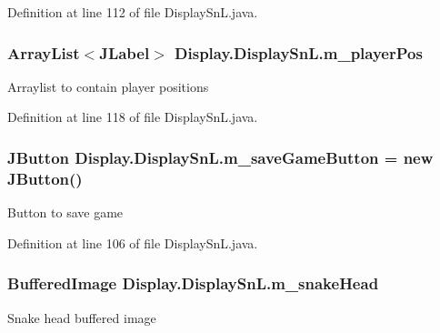 Definition at line 112 of file Display\+Sn\+L.\+java.

\hypertarget{class_display_1_1_display_sn_l_aa4b30638e1d8f99b5052652ea02d6365}{}
\subsubsection[{m\+\_\+player\+Pos}]{\setlength{\rightskip}{0pt plus 5cm}Array\+List$<$J\+Label$>$ Display.\+Display\+Sn\+L.\+m\+\_\+player\+Pos\hspace{0.3cm}{\ttfamily [private]}}\label{class_display_1_1_display_sn_l_aa4b30638e1d8f99b5052652ea02d6365}
Arraylist to contain player positions 

Definition at line 118 of file Display\+Sn\+L.\+java.

\hypertarget{class_display_1_1_display_sn_l_a7ae26c71761566ba21e8eb4e4981969f}{}
\subsubsection[{m\+\_\+save\+Game\+Button}]{\setlength{\rightskip}{0pt plus 5cm}J\+Button Display.\+Display\+Sn\+L.\+m\+\_\+save\+Game\+Button = new J\+Button()\hspace{0.3cm}{\ttfamily [private]}}\label{class_display_1_1_display_sn_l_a7ae26c71761566ba21e8eb4e4981969f}
Button to save game 

Definition at line 106 of file Display\+Sn\+L.\+java.

\hypertarget{class_display_1_1_display_sn_l_ad8119225e6027adeced313ef342b67a2}{}
\subsubsection[{m\+\_\+snake\+Head}]{\setlength{\rightskip}{0pt plus 5cm}Buffered\+Image Display.\+Display\+Sn\+L.\+m\+\_\+snake\+Head\hspace{0.3cm}{\ttfamily [private]}}\label{class_display_1_1_display_sn_l_ad8119225e6027adeced313ef342b67a2}
Snake head buffered image 

